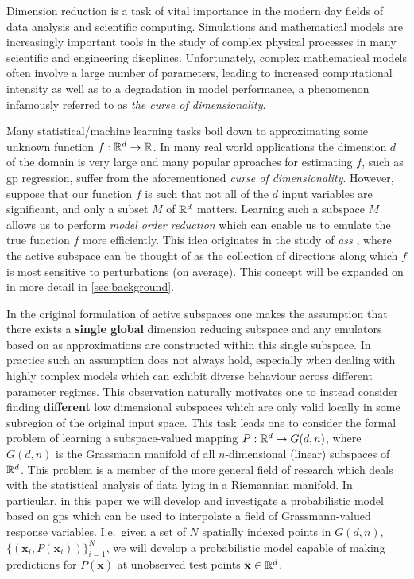 Dimension reduction is a task of vital importance in the modern day fields of data analysis and scientific computing. Simulations and mathematical models are increasingly important tools in the study of complex physical processes in many scientific and engineering discplines. Unfortunately, complex mathematical models often involve a large number of parameters, leading to increased computational intensity as well as to a degradation in model performance, a phenomenon infamously referred to as \textit{the curse of dimensionality}.

Many statistical/machine learning tasks boil down to approximating some unknown function $f:\mathbb{R}^{d}\rightarrow\mathbb{R}$. In many real world applications the dimension $d$ of the domain is very large and many popular aproaches for estimating $f$, such as \ac{gp} regression, suffer from the aforementioned \textit{curse of dimensionality}. However, suppose that our function $f$ is such that not all of the $d$ input variables are significant, and only a subset $M$ of $\mathbb{R}^{d}$ matters. Learning such a subspace $M$ allows us to perform \textit{model order reduction} which can enable us to emulate the true function $f$ more efficiently. This idea originates in the study of \textit{\acp{as}} \cite{constantineActiveSubspacesEmerging2015a}, where the active subspace can be thought of as the collection of directions along which $f$ is most sensitive to perturbations (on average). This concept will be expanded on in more detail in \cref{sec:background}.

In the original formulation of active subspaces one makes the assumption that there exists a \textbf{single global} dimension reducing subspace and any emulators based on \ac{as} approximations are constructed within this single subspace. In practice such an assumption does not always hold, especially when dealing with highly complex models which can exhibit diverse behaviour across different parameter regimes. This observation naturally motivates one to instead consider finding \textbf{different} low dimensional subspaces which are only valid locally in some subregion of the original input space. This task leads one to consider the formal problem of learning a subspace-valued mapping $P:\mathbb{R}^{d}\rightarrow G(d,n)$, where $G(d,n)$  is the Grassmann manifold of all $n$-dimensional (linear) subspaces of $\mathbb{R}^{d}$. This problem is a member of the more general field of research which deals with the statistical analysis of data lying in a Riemannian manifold. In particular, in this paper we will develop and investigate a probabilistic model based on \acp{gp} which can be used to interpolate a field of Grassmann-valued response variables. I.e.\ given a set of $N$ spatially indexed points in $G(d,n)$, $\{(\mathbf{x}_{i},P(\mathbf{x}_{i}))\}_{i=1}^{N}$, we will develop a probabilistic model capable of making predictions for $P(\tilde{\mathbf{x}})$ at unobserved test points $\tilde{\mathbf{x}}\in\mathbb{R}^{d}$.

